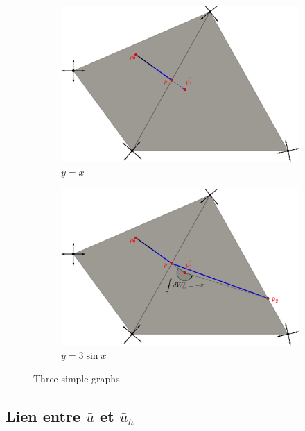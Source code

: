 \begin{figure}[!h]
     \centering
     \begin{subfigure}[b]{0.7\textwidth}
         \centering
         \includegraphics[width=\textwidth]{images/draw_streams_21.pdf}
         \caption{$y=x$}
         \label{fig:y equals x}
     \end{subfigure}
     \begin{subfigure}[b]{0.7\textwidth}
         \centering
         \includegraphics[width=\textwidth]{images/draw_streams_22.pdf}
         \caption{$y=3\sin x$}
         \label{fig:three sin x}
     \end{subfigure}
        \caption{Three simple graphs}
        \label{fig:draw_streams_1}
\end{figure}


\subsection{Lien entre $\bar{u}$ et $\bar{u}_h$}

